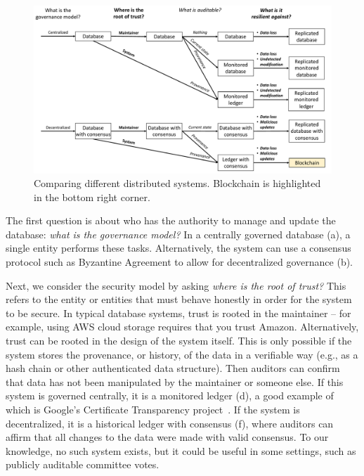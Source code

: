 {\begin{figure}
	\centering
	\includegraphics[width=\textwidth]{figures/BlockchainFlowchart}
	\caption{Comparing different distributed systems. Blockchain is highlighted in the bottom right corner.}
	\label{fig:blockchainFlowchart}
\end{figure}

The first question is about who has the authority to manage and update the database: \emph{what is the governance model?} In a centrally governed database (a), a single entity performs these tasks. Alternatively, the system can use a consensus protocol such as Byzantine Agreement to allow for decentralized governance (b).

Next, we consider the security model by asking \emph{where is the root of trust?} This refers to the entity or entities that must behave honestly in order for the system to be secure. In typical database systems, trust is rooted in the maintainer -- for example, using AWS cloud storage requires that you trust Amazon. Alternatively, trust can be rooted in the design of the system itself. This is only possible if the system stores the provenance, or history, of the data in a verifiable way (e.g., as a hash chain or other authenticated data structure). Then auditors can confirm that data has not been manipulated by the maintainer or someone else. If this system is governed centrally, it is a monitored ledger (d), a good example of which is Google's Certificate Transparency project~\cite{CT}. If the system is decentralized, it is a historical ledger with consensus (f), where auditors can affirm that all changes to the data were made with valid consensus. To our knowledge, no such system exists, but it could be useful in some settings, such as publicly auditable committee votes. 

}
